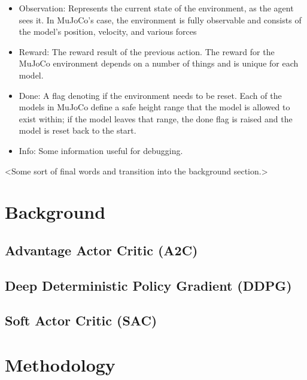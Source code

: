 \documentclass[conference]{IEEEtran}
\begin{document}
\begin{itemize}
    \item Observation: Represents the current state of the environment, as the agent sees it. In MuJoCo's case, the
    environment is fully observable and consists of the model's position, velocity, and various forces \cite{gym_source}
    \item Reward: The reward result of the previous action. The reward for the MuJoCo environment depends on a
    number of things and is unique for each model.
    \item Done: A flag denoting if the environment needs to be reset. Each of the models in MuJoCo define a safe height
    range that the model is allowed to exist within; if the model leaves that range, the done flag is raised and the
    model is reset back to the start.
    \item Info: Some information useful for debugging.
\end{itemize}



<Some sort of final words and transition into the background section.>

\section{Background}

\blindtext

\subsection{Advantage Actor Critic (A2C)}

\blindtext

\subsection{Deep Deterministic Policy Gradient (DDPG)}

\blindtext

\subsection{Soft Actor Critic (SAC)}

\blindtext

\section{Methodology}
\end{document}
